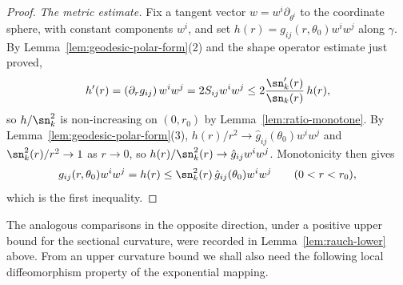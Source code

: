 \begin{proof}
\emph{The metric estimate.} Fix a tangent vector $w=w^i
\partial_{\theta^i}$ to the coordinate sphere, with constant
components $w^i$, and set $h(r)=g_{ij}(r,\theta_0)w^iw^j$ along
$\gamma$. By Lemma~\ref{lem:geodesic-polar-form}(2) and the shape
operator estimate just proved,
$$h'(r)=\left(\partial_rg_{ij}\right)w^iw^j=2S_{ij}w^iw^j
\le2\frac{\sn_k'(r)}{\sn_k(r)}\,h(r),$$
so $h/\sn_k^2$ is non-increasing on $(0,r_0)$ by
Lemma~\ref{lem:ratio-monotone}. By Lemma~\ref{lem:geodesic-polar-form}(3),
$h(r)/r^2\to\hat g_{ij}(\theta_0)w^iw^j$ and
$\sn_k^2(r)/r^2\to 1$ as $r\to0$, so
$h(r)/\sn_k^2(r)\to\hat g_{ij}w^iw^j$. Monotonicity then gives
$$g_{ij}(r,\theta_0)w^iw^j=h(r)\le\sn_k^2(r)\,\hat
g_{ij}(\theta_0)w^iw^j\qquad(0<r<r_0),$$
which is the first inequality.
\end{proof}

The analogous comparisons in the opposite direction, under a
positive upper bound for the sectional curvature, were recorded in
Lemma~\ref{lem:rauch-lower} above. From an upper curvature bound we
shall also need the following local diffeomorphism property of the
exponential mapping.



